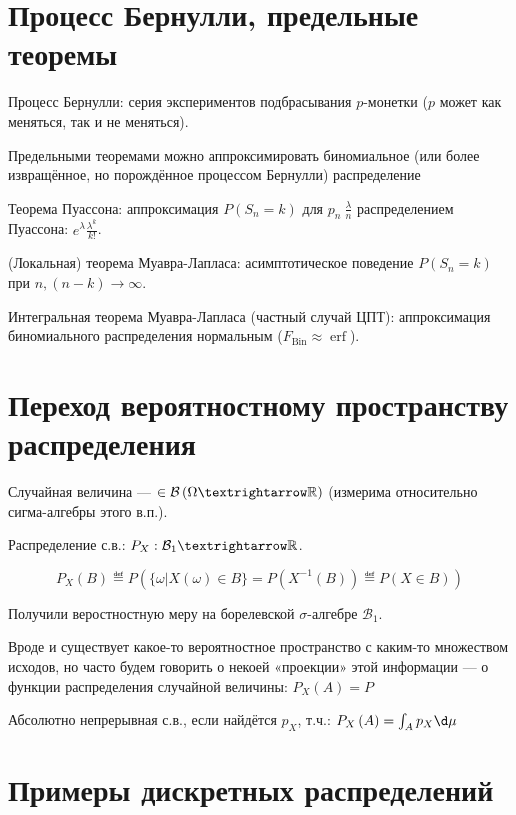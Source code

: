 \documentclass[12pt, a4paper, oneside]{article}
\begin{document}
\section{Процесс Бернулли, предельные теоремы}

Процесс Бернулли: серия экспериментов подбрасывания $p$-монетки ($p$ может как меняться, так и не меняться).


Предельными теоремами можно аппроксимировать биномиальное
(или более извращённое, но порождённое процессом Бернулли) распределение

Теорема Пуассона: аппроксимация $P(S_n = k)$ для $p_n ~ \frac{\lambda}{n}$ распределением Пуассона: $e^\lambda \frac{\lambda^k}{k!}$.

(Локальная) теорема Муавра-Лапласа: асимптотическое поведение $P(S_n = k)$ при $n, (n - k) → ∞$.

Интегральная теорема Муавра-Лапласа (частный случай ЦПТ): аппроксимация биномиального распределения нормальным ($F_\mathrm{Bin} ≈ \operatorname{erf}$).


\section{Переход вероятностному пространству распределения}

Случайная величина — $\in \mathcal{B}\left( \Omega → \sR \right)$ (измерима относительно сигма-алгебры этого в.п.).

Распределение с.в.: $P_X : \mathcal{B}_1 → \sR$.

\begin{equation}
    P_X(B) \eqdef P\left( \{\omega | X\left( \omega \right)  \in B \} = P\left( X^{-1}(B) \right) \eqdef P\left( X \in B \right)  \right)
\end{equation}

Получили веростностную меру на борелевской $\sigma$-алгебре $\mathcal{B}_1$.

Вроде и существует какое-то вероятностное пространство с каким-то множеством исходов, но часто будем говорить о 
некоей «проекции» этой информации — о функции распределения случайной величины: $P_X\left( A \right) = P$

Абсолютно непрерывная с.в., если найдётся $p_X$, т.ч.: $P_X\left( A \right) = \int_A p_X \d \mu$



\section{Примеры дискретных распределений}
\end{document}
